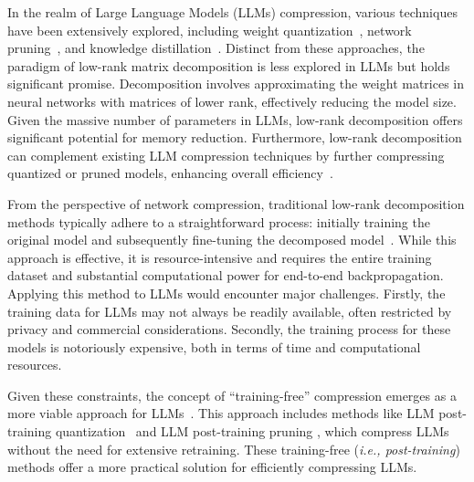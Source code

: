 In the realm of Large Language Models (LLMs) compression, various techniques have been extensively explored, including weight quantization~\citep{dettmers2022llm}, network pruning~\citep{frantar2023sparsegpt}, and knowledge distillation~\citep{agarwal2023gkd}. 
Distinct from these approaches, the paradigm of low-rank matrix decomposition is less explored in LLMs but holds significant promise. Decomposition involves approximating the weight matrices in neural networks with matrices of lower rank, effectively reducing the model size. Given the massive number of parameters in LLMs, low-rank decomposition offers significant potential for memory reduction. 
Furthermore, low-rank decomposition can complement existing LLM compression techniques by further compressing quantized or pruned models, enhancing overall efficiency~\citep{cheng2017survey}.


From the perspective of network compression, traditional low-rank decomposition methods typically adhere to a straightforward process: initially training the original model and subsequently fine-tuning the decomposed model~\citep{jaderberg2014speeding,khodak2021initialization,wang2021pufferfish,hsu2022language}. While this approach is effective, it is resource-intensive and requires the entire training dataset and substantial computational power for end-to-end backpropagation. Applying this method to LLMs would encounter major challenges. Firstly, the training data for LLMs may not always be readily available, often restricted by privacy and commercial considerations. Secondly, the training process for these models is notoriously expensive, both in terms of time and computational resources. 

Given these constraints, the concept of ``training-free'' compression emerges as a more viable approach for LLMs~\citep{zhu2023survey}. This approach includes methods like LLM post-training quantization~\citep{dettmers2022llm,yuan2023rptq} and LLM post-training pruning \citep{frantar2023sparsegpt}, which compress LLMs without the need for extensive retraining.
These training-free (\textit{i.e., post-training}) methods offer a more practical solution for efficiently compressing LLMs. 



